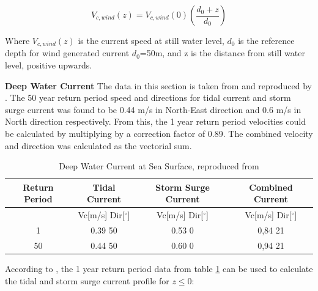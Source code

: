   \begin{equation}
      V_{c,wind}(z)= V_{c,wind}(0) \left( \frac{d_0+z}{d_0}\right)
  \end{equation}
  
  \noindent Where $ V_{c,wind}(z)$ is the current speed at still water level, $d_0$ is the reference depth for wind generated current $d_0$=50m, and z is the distance from still water level, positive upwards. \newline
  \newline
  
   \noindent \textbf{Deep Water Current } 
   The data in this section is taken from \cite{hseenironmental} and reproduced by \cite{Lifes50+D1.1}.\newline
   \newline
   The 50 year return period speed and directions for tidal current and storm surge current was found to be 0.44 m/s in North-East direction and 0.6 m/s in North direction respectively. From this, the 1 year return period velocities could be calculated by multiplying by a correction factor of 0.89. The combined velocity and direction was calculated as the vectorial sum.
   
   
\begin{table} [H]
\centering
\begin{tabular}{ |c|c|c|c|}
\hline
Return Period & Tidal Current & Storm Surge Current & Combined Current \\
 \hline
 \hline
 & Vc[m/s] \hspace{0.3cm} Dir[$^{\circ}$] &  Vc[m/s] \hspace{0.3cm} Dir[$^{\circ}$] & Vc[m/s] \hspace{0.3cm} Dir[$^{\circ}$] \\
 \hline
 1 & 0.39 \hspace{0.7cm} 50 & 0.53 \hspace{0.7cm} 0  & 0,84 \hspace{0.7cm} 21 \\
 50 & 0.44 \hspace{0.7cm} 50 & 0.60 \hspace{0.7cm} 0  & 0,94 \hspace{0.7cm} 21 \\
 \hline
\end{tabular}
\caption{Deep Water Current at Sea Surface, reproduced from \cite{Lifes50+D1.1}}
\label{table:tidcur}
\end{table} 

\noindent According to \cite{dnvenviroment}, the 1 year return period data from table \ref{table:tidcur} can be used to calculate the tidal and storm surge current profile for $z \leq 0$:

